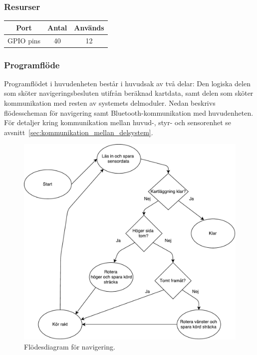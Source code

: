 \documentclass{article}
\begin{document}
\subsubsection{Resurser}


\begin{table}[H]
   \centering
  \begin{tabular}{ | c | c | c | }
    \hline
    \textbf{Port} & \textbf{Antal} & \textbf{Används} \\
    \hline
    GPIO pins & 40 & 12 \\
    \hline
  \end{tabular}
\end{table}


\subsubsection{Programflöde}
Programflödet i huvudenheten består i huvudsak av två delar: Den logiska delen som sköter navigeringsbesluten utifrån beräknad kartdata, samt delen som sköter kommunikation med resten av systemets delmoduler. Nedan beskrivs flödesscheman för navigering samt Bluetooth-kommunikation med huvudenheten. För detaljer kring kommunikation mellan huvud-, styr- och sensorenhet se avsnitt~\ref{sec:kommunikation_mellan_delsystem}. 
\begin{figure}[H]
\centering
\includegraphics[scale=0.6]{navigering_flowchart}
\caption{Flödesdiagram för navigering.}
\label{fig:navigering_flowchart}
\end{figure}
\ \\
\end{document}
